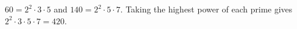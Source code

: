 $60=2^2\cdot3\cdot5$ and $140=2^2\cdot5\cdot7$. Taking the highest power of each prime gives $2^2\cdot3\cdot5\cdot7=\boxed{420}$.
